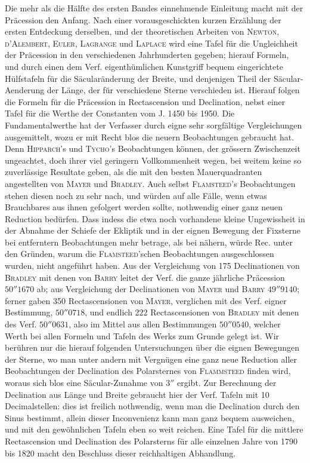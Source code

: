 Die mehr als die Hälfte des ersten Bandes einnehmende Einleitung macht mit der Präcession den Anfang. Nach einer vorausgeschickten kurzen Erzählung der ersten Entdeckung derselben, und der theoretischen Arbeiten von \textsc{Newton}, \textsc{d'Alembert}, \textsc{Euler}, \textsc{Lagrange} und \textsc{Laplace} wird eine Tafel für die Ungleichheit der Präcession in den verschiedenen Jahrhunderten gegeben; hierauf Formeln, und durch einen dem Verf. eigenthümlichen Kunstgriff bequem eingerichtete Hülfstafeln für die Säcularänderung der Breite, und denjenigen Theil der Säcular-Aenderung der Länge, der für verschiedene Sterne verschieden ist. Hierauf folgen die Formeln für die Präcession in Rectascension und Declination, nebst einer Tafel für die Werthe der Constanten vom J. 1450 bis 1950. Die Fundamentalwerthe hat der Verfasser durch eigne sehr sorgfältige Vergleichungen ausgemittelt, wozu er mit Recht blos die neuern Beobachtungen gebraucht hat. Denn \textsc{Hipparch}'s und \textsc{Tycho}'s Beobachtungen können, der grössern Zwischenzeit ungeachtet, doch ihrer viel geringern Vollkommenheit wegen, bei weitem keine so zuverlässige Resultate geben, als die mit den besten Mauerquadranten angestellten von \textsc{Mayer} und \textsc{Bradley}. Auch selbst \textsc{Flamsteed}'s Beobachtungen stehen diesen noch zu sehr nach, und würden auf alle Fälle, wenn etwas Brauchbares aus ihnen gefolgert werden sollte, nothwendig einer ganz neuen Reduction bedürfen. Dass indess die etwa noch vorhandene kleine Ungewissheit in der Abnahme der Schiefe der Ekliptik und in der eignen Bewegung der Fixsterne bei entferntern Beobachtungen mehr betrage, als bei nähern, würde Rec. unter den Gründen, warum die \textsc{Flamsteed}'schen Beobachtungen ausgeschlossen wurden, nicht angeführt haben. Aus der Vergleichung von 175 Declinationen von \textsc{Bradley} mit denen von \textsc{Barry} leitet der Verf. die ganze jährliche Präcession $50''1670$ ab; aus Vergleichung der Declinationen von \textsc{Mayer} und \textsc{Barry} $49''9140$; ferner gaben 350 Rectascensionen von \textsc{Mayer}, verglichen mit des Verf. eigner Bestimmung, $50''0718$, und endlich 222 Rectascensionen von \textsc{Bradley} mit denen des Verf. $50''0631$, also im Mittel aus allen Bestimmungen $50''0540$, welcher Werth bei allen Formeln und Tafeln des Werks zum Grunde gelegt ist. Wir berühren nur die hierauf folgenden Untersuchungen über die eignen Bewegungen der Sterne, wo man unter andern mit Vergnügen eine ganz neue Reduction aller Beobachtungen der Declination des Polarsternes von \textsc{Flammsteed} finden wird, woraus sich blos eine Säcular-Zunahme von $3''$ ergibt. Zur Berechnung der Declination aus Länge und Breite gebraucht hier der Verf. Tafeln mit 10 Decimalstellen: dies ist freilich nothwendig, wenn man die Declination durch den Sinus bestimmt, allein dieser Inconvenienz kann man ganz bequem ausweichen, und mit den gewöhnlichen Tafeln eben so weit reichen. Eine Tafel für die mittlere Rectascension und Declination des Polarsterns für alle einzelnen Jahre von 1790 bis 1820 macht den Beschluss dieser reichhaltigen Abhandlung.

